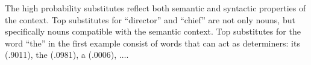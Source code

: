 The high probability substitutes reflect both semantic and syntactic
properties of the context.  Top substitutes for ``director'' and
``chief'' are not only nouns, but specifically nouns compatible with
the semantic context.  Top substitutes for the word ``the'' in the
first example consist of words that can act as determiners: its
(.9011), the (.0981), a (.0006), $\ldots$.






